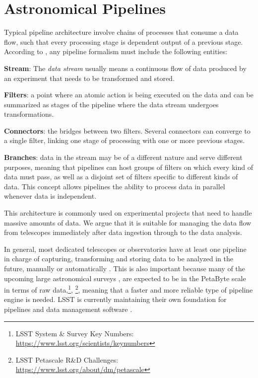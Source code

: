 \documentclass[final,5p,times,twocolumn,authoryear]{elsarticle}
\begin{document}
\section{Astronomical Pipelines}
\label{section:pipearch}
%
Typical pipeline architecture involve chains of processes that consume a data flow, such
that every processing stage is dependent output of a previous stage.
%
According to \citet{bowman-amuah_processing_2004}, any pipeline formalism must include
the following entities:
%
\begin{description}
  \item \textbf{Stream}:  The \textit{data stream} usually means a
     continuous flow of data produced by an experiment that needs to
     be transformed and stored.
  \item \textbf{Filters}: a point where an atomic action is being
     executed on the data and can be summarized as stages of the
     pipeline where the data stream undergoes transformations.
  \item \textbf{Connectors}: the bridges between two filters.  Several
     connectors can converge to a single filter, linking one stage of
     processing with one or more previous stages.
  \item \textbf{Branches}: data in the stream may be of a different
     nature and serve different purposes, meaning that pipelines
     can host groups of filters on which every kind of data must pass,
     as well as a disjoint set of filters specific to different
     kinds of data. This concept allows pipelines the ability to
     process data in parallel whenever data is independent.
\end{description}
%
This architecture is commonly used on experimental projects that need
to handle massive amounts of data.
%
We argue that it is suitable for managing the data flow
from telescopes immediately after data ingestion through to the
data analysis.

In general, most dedicated telescopes or observatories have at
least one pipeline in charge of capturing, transforming and storing
data to be analyzed in the future, manually or
automatically \citep{klaus_kepler_2010, tucker_sloan_2006,
emerson_vista_2004}.
%
This is also important because many of the upcoming large astronomical
surveys
\citep[e.g. \href{https://www.lsst.org/}{LSST}, ][]{lsst_2008}, are
expected to be in the PetaByte scale in terms of raw
data,\footnote{LSST System \& Survey Key Numbers: \url{https://www.lsst.org/scientists/keynumbers}},
\footnote{LSST Petascale R\&D Challenges: \url{https://www.lsst.org/about/dm/petascale}}, meaning that a faster
and more reliable type of pipeline engine is needed. LSST is currently
maintaining their own foundation for pipelines and data management software
\citep{axelrod2010open}.
\end{document}
